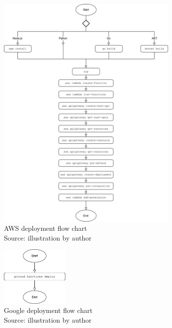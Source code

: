 \begin{figure}[htp]
\begin{center}
\includegraphics[width=0.8\textwidth]{bilder/AWS_Deploy_Flow.png}
\captionsetup{justification=centering, labelfont=bf}
\caption[AWS deployment flow chart]{AWS deployment flow chart\\Source: illustration by author}
\label{fig:aws_deploy}
\end{center}
\end{figure}

\begin{figure}[htp]
\begin{center}
\includegraphics[width=0.3\textwidth]{bilder/Google_Deploy_Flow.png}
\captionsetup{justification=centering, labelfont=bf}
\caption[Google deployment flow chart]{Google deployment flow chart\\Source: illustration by author}
\label{fig:google_deploy}
\end{center}
\end{figure}


